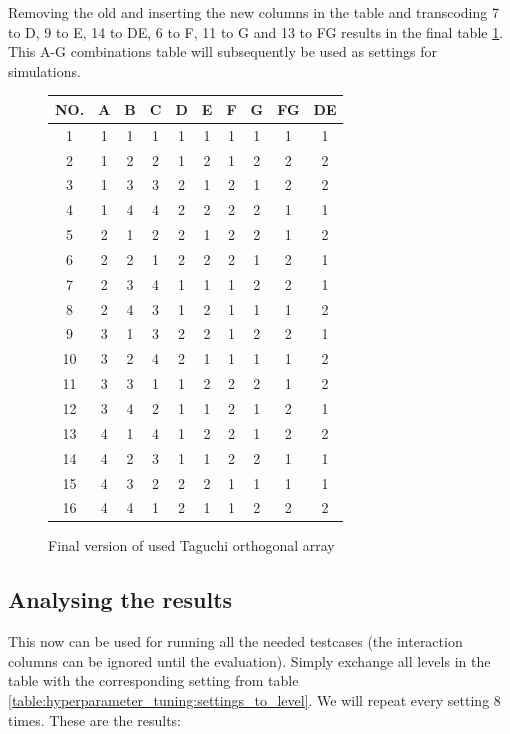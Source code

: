 Removing the old and inserting the new columns in the table and transcoding 7 to D, 9 to E, 14 to DE, 6 to F, 11 to G and 13 to FG results in the final table \ref{table:hyperparameter_tuning:final_taguchi}.
This A-G combinations table will subsequently be used as settings for simulations.

\begin{figure}[H]
	\centering
	\begin{tabular}{ |c||c|c|c|c|c|c|c|c|c|  }
		\hline
		NO.& A & B & C & D & E & F & G & FG& DE\\
		\hline
		1  & 1 & 1 & 1 & 1 & 1 & 1 & 1 & 1 & 1\\
		2  & 1 & 2 & 2 & 1 & 2 & 1 & 2 & 2 & 2\\
		3  & 1 & 3 & 3 & 2 & 1 & 2 & 1 & 2 & 2\\
		4  & 1 & 4 & 4 & 2 & 2 & 2 & 2 & 1 & 1\\
		5  & 2 & 1 & 2 & 2 & 1 & 2 & 2 & 1 & 2\\
		6  & 2 & 2 & 1 & 2 & 2 & 2 & 1 & 2 & 1\\
		7  & 2 & 3 & 4 & 1 & 1 & 1 & 2 & 2 & 1\\
		8  & 2 & 4 & 3 & 1 & 2 & 1 & 1 & 1 & 2\\
		9  & 3 & 1 & 3 & 2 & 2 & 1 & 2 & 2 & 1\\
		10 & 3 & 2 & 4 & 2 & 1 & 1 & 1 & 1 & 2\\
		11 & 3 & 3 & 1 & 1 & 2 & 2 & 2 & 1 & 2\\
		12 & 3 & 4 & 2 & 1 & 1 & 2 & 1 & 2 & 1\\
		13 & 4 & 1 & 4 & 1 & 2 & 2 & 1 & 2 & 2\\
		14 & 4 & 2 & 3 & 1 & 1 & 2 & 2 & 1 & 1\\
		15 & 4 & 3 & 2 & 2 & 2 & 1 & 1 & 1 & 1\\
		16 & 4 & 4 & 1 & 2 & 1 & 1 & 2 & 2 & 2\\
		\hline
	\end{tabular}
	\caption{Final version of used Taguchi orthogonal array}
	\label{table:hyperparameter_tuning:final_taguchi}
\end{figure}


\subsection{Analysing the results}
\label{chap:hyperparameter_tuning:analysis_of_results}
This now can be used for running all the needed testcases (the interaction columns can be ignored until the evaluation). Simply exchange all levels in the table with the corresponding setting from table \ref{table:hyperparameter_tuning:settings_to_level}. We will repeat every setting 8 times. These are the results:


